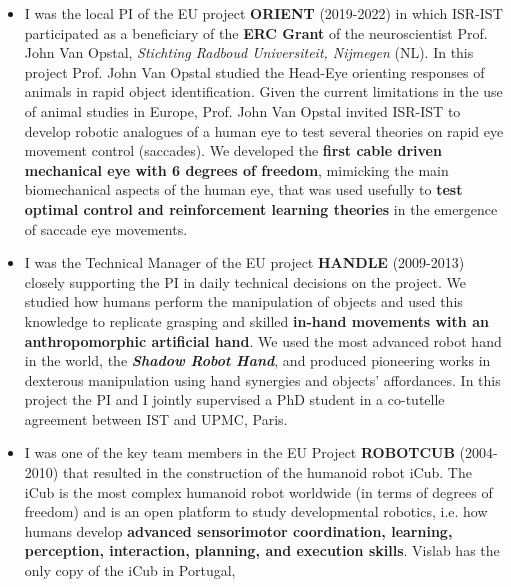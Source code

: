 \documentclass[
]{article}
\begin{document}
\begin{itemize}
  \textbf{monitoring of critical infrastructures} (bridges, buildings,
  dams), \textbf{wildfires in the national forest}, and for the
  \textbf{surveillance of maritime events} like illegal naval traffic
  and pollution spots. These projects developed strong links with the
  \textbf{Naval School} and the \textbf{Air Force Academy}, as well as
  with national technological companies like \textbf{Tekever},
  \textbf{UAVision}, and \textbf{Critical Software}.
\item
  I was the local PI of the EU project \textbf{ORIENT} (2019-2022) in
  which ISR-IST participated as a beneficiary of the \textbf{ERC Grant}
  of the neuroscientist Prof. John Van Opstal, \emph{Stichting Radboud
  Universiteit, Nijmegen} (NL). In this project Prof. John Van Opstal
  studied the Head-Eye orienting responses of animals in rapid object
  identification. Given the current limitations in the use of animal
  studies in Europe, Prof. John Van Opstal invited ISR-IST to develop
  robotic analogues of a human eye to test several theories on rapid eye
  movement control (saccades). We developed the \textbf{first cable
  driven mechanical eye with 6 degrees of freedom}, mimicking the main
  biomechanical aspects of the human eye, that was used usefully to
  \textbf{test optimal control and reinforcement learning theories} in
  the emergence of saccade eye movements.
\item
  I was the Technical Manager of the EU project \textbf{HANDLE}
  (2009-2013) closely supporting the PI in daily technical decisions on
  the project. We studied how humans perform the manipulation of objects
  and used this knowledge to replicate grasping and skilled
  \textbf{in-hand movements with an anthropomorphic artificial hand}. We
  used the most advanced robot hand in the world, the
  \emph{\textbf{Shadow Robot Hand}}, and produced pioneering works in
  dexterous manipulation using hand synergies and objects' affordances.
  In this project the PI and I jointly supervised a PhD student in a
  co-tutelle agreement between IST and UPMC, Paris.
\item
  I was one of the key team members in the EU Project \textbf{ROBOTCUB}
  (2004-2010) that resulted in the construction of the humanoid robot
  iCub. The iCub is the most complex humanoid robot worldwide (in terms
  of degrees of freedom) and is an open platform to study developmental
  robotics, i.e. how humans develop \textbf{advanced sensorimotor
  coordination, learning, perception, interaction, planning, and
  execution skills}. Vislab has the only copy of the iCub in Portugal,

\end{itemize}
\end{document}
